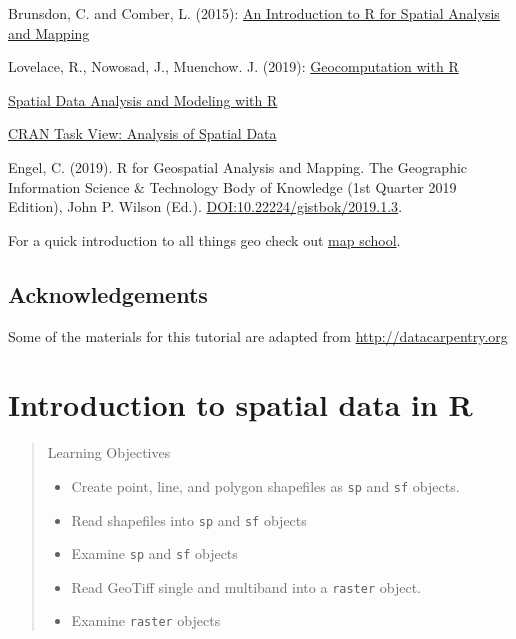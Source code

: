 \documentclass[]{book}
\providecommand{\tightlist}{%
  \setlength{\itemsep}{0pt}\setlength{\parskip}{0pt}}
\begin{document}
Brunsdon, C. and Comber, L. (2015):
\href{https://us.sagepub.com/en-us/nam/an-introduction-to-r-for-spatial-analysis-and-mapping/book241031}{An
Introduction to R for Spatial Analysis and Mapping}

Lovelace, R., Nowosad, J., Muenchow. J. (2019):
\href{https://geocompr.robinlovelace.net}{Geocomputation with R}

\href{http://www.rspatial.org/index.html}{Spatial Data Analysis and
Modeling with R}

\href{https://CRAN.R-project.org/view=Spatial}{CRAN Task View: Analysis
of Spatial Data}

Engel, C. (2019). R for Geospatial Analysis and Mapping. The Geographic
Information Science \& Technology Body of Knowledge (1st Quarter 2019
Edition), John P. Wilson (Ed.).
\href{https://doi.org/10.22224/gistbok/2019.1.3}{DOI:10.22224/gistbok/2019.1.3}.

For a quick introduction to all things geo check out
\href{https://mapschool.io}{map school}.

\section*{Acknowledgements}\label{acknowledgements}

Some of the materials for this tutorial are adapted from
\url{http://datacarpentry.org}

\chapter{Introduction to spatial data in R}\label{intro}

\begin{quote}
Learning Objectives

\begin{itemize}
\tightlist
\item
  Create point, line, and polygon shapefiles as \texttt{sp} and
  \texttt{sf} objects.
\item
  Read shapefiles into \texttt{sp} and \texttt{sf} objects
\item
  Examine \texttt{sp} and \texttt{sf} objects
\item
  Read GeoTiff single and multiband into a \texttt{raster} object.
\item
  Examine \texttt{raster} objects
\end{itemize}
\end{quote}
\end{document}
